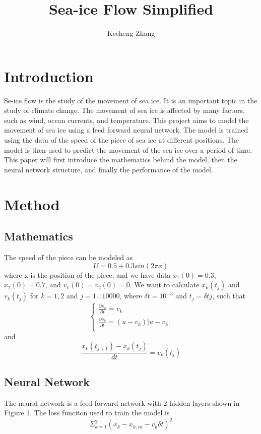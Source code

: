 \documentclass[12pt, a4paper]{article}
\begin{document}
\title{Sea-ice Flow Simplified}
\author{Kecheng Zhang}
\maketitle


\section{Introduction}
Se-ice flow is the study of the movement of sea ice. It is an important topic in the study of climate change. The movement of sea ice is affected by many factors, such as wind, ocean currents, and temperature.
This project aims to model the movement of sea ice using a feed forward neural network. The model is trained using the data of the speed of the piece of sea ice at different positions. The model is then used to predict the movement of the sea ice over a period of time.
This paper will first introduce the mathematics behind the model, then the neural network structure, and finally the performance of the model.
\section{Method}

\subsection{Mathematics}
The speed of the piece can be modeled as
$$ U = 0.5 + 0.3sin(2 \pi x) $$
where x is the position of the piece, and we have data
$x_1(0) = 0.3$, $x_2(0) = 0.7$, and $v_1(0) = v_2(0) = 0$.
We want to calculate
$x_k(t_j)$ and $v_k(t_j)$ for $k = 1, 2$ and $j = 1\dots10000$, where
$\delta t = 10^{-3}$ and $t_j = \delta t j$, such that
$$\begin{cases}
    \frac{\partial x_k}{\partial t} = v_k\\
    \frac{\partial v_k}{\partial t} = (u - v_k) |u - v_k|\\
    \end{cases}$$
and $$ \frac{x_k(t_{j+1}) - x_k(t_j)}{dt} = v_k(t_j)$$

\subsection{Neural Network}
The neural network is a feed-forward network with 2 hidden layers shown in Figure 1. The loss funciton used to train the model is $$\Sigma^2_{k=1}(x_k - x_{k,in} - v_k\delta t)^2$$
\end{document}
